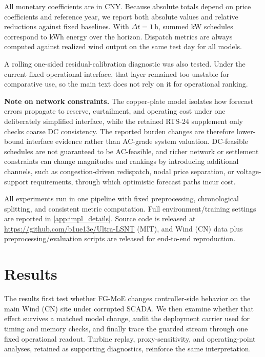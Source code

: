 \documentclass[review,1p,times]{elsarticle}
\begin{document}
All monetary coefficients are in CNY. Because absolute totals depend on price coefficients and reference year, we report both absolute values and relative reductions against fixed baselines. With $\Delta t=1$\,h, summed kW schedules correspond to kWh energy over the horizon. Dispatch metrics are always computed against realized wind output on the same test day for all models.

A rolling one-sided residual-calibration diagnostic was also tested. Under the current fixed operational interface, that layer remained too unstable for comparative use, so the main text does not rely on it for operational ranking.

\noindent\textbf{Note on network constraints.} The copper-plate model isolates how forecast errors propagate to reserve, curtailment, and operating cost under one deliberately simplified interface, while the retained RTS-24 supplement only checks coarse DC consistency. The reported burden changes are therefore lower-bound interface evidence rather than AC-grade system valuation. DC-feasible schedules are not guaranteed to be AC-feasible, and richer network or settlement constraints can change magnitudes and rankings by introducing additional channels, such as congestion-driven redispatch, nodal price separation, or voltage-support requirements, through which optimistic forecast paths incur cost.

All experiments run in one pipeline with fixed preprocessing, chronological splitting, and consistent metric computation. Full environment/training settings are reported in \ref{app:impl_details}. Source code is released at \url{https://github.com/b1ue13e/Ultra-LSNT} (MIT), and Wind (CN) data plus preprocessing/evaluation scripts are released for end-to-end reproduction.

\section{Results}
\label{sec:results}
The results first test whether FG-MoE changes controller-side behavior on the main Wind (CN) site under corrupted SCADA. We then examine whether that effect survives a matched model change, audit the deployment carrier used for timing and memory checks, and finally trace the guarded stream through one fixed operational readout. Turbine replay, proxy-sensitivity, and operating-point analyses, retained as supporting diagnostics, reinforce the same interpretation.
\end{document}
